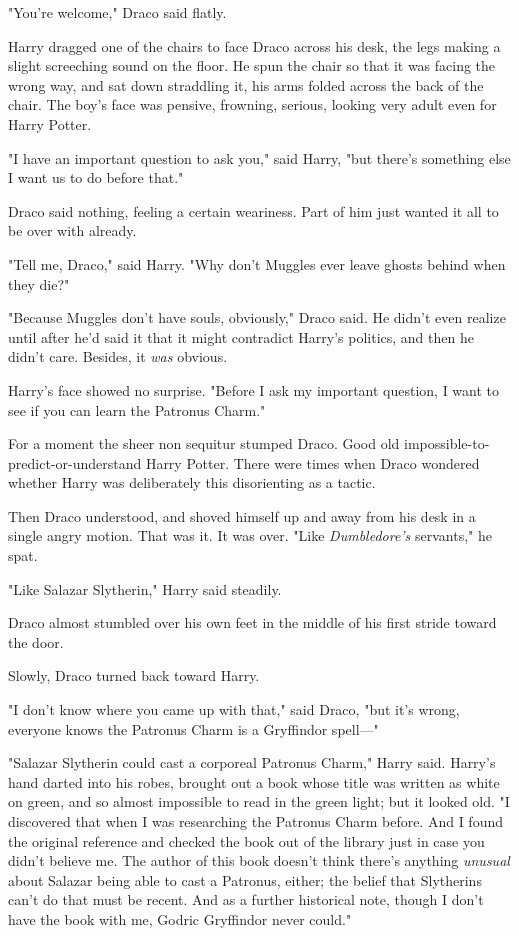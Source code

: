 "You're welcome," Draco said flatly.

Harry dragged one of the chairs to face Draco across his desk, the legs making
a slight screeching sound on the floor. He spun the chair so that it was facing
the wrong way, and sat down straddling it, his arms folded across the back of
the chair. The boy's face was pensive, frowning, serious, looking very adult
even for Harry Potter.

"I have an important question to ask you," said Harry, "but there's something
else I want us to do before that."

Draco said nothing, feeling a certain weariness. Part of him just wanted it all
to be over with already.

"Tell me, Draco," said Harry. "Why don't Muggles ever leave ghosts behind when
they die?"

"Because Muggles don't have souls, obviously," Draco said. He didn't even
realize until after he'd said it that it might contradict Harry's politics, and
then he didn't care. Besides, it \emph{was} obvious.

Harry's face showed no surprise. "Before I ask my important question, I want to
see if you can learn the Patronus Charm."

For a moment the sheer non sequitur stumped Draco. Good old
impossible-to-predict-or-understand Harry Potter. There were times when Draco
wondered whether Harry was deliberately this disorienting as a tactic.

Then Draco understood, and shoved himself up and away from his desk in a single
angry motion. That was it. It was over. "Like \emph{Dumbledore's} servants," he
spat.

"Like Salazar Slytherin," Harry said steadily.

Draco almost stumbled over his own feet in the middle of his first stride
toward the door.

Slowly, Draco turned back toward Harry.

"I don't know where you came up with that," said Draco, "but it's wrong,
everyone knows the Patronus Charm is a Gryffindor spell\mbox{---}"

"Salazar Slytherin could cast a corporeal Patronus Charm," Harry said. Harry's
hand darted into his robes, brought out a book whose title was written as white
on green, and so almost impossible to read in the green light; but it looked
old. "I discovered that when I was researching the Patronus Charm before. And I
found the original reference and checked the book out of the library just in
case you didn't believe me. The author of this book doesn't think there's
anything \emph{unusual} about Salazar being able to cast a Patronus, either;
the belief that Slytherins can't do that must be recent. And as a further
historical note, though I don't have the book with me, Godric Gryffindor never
could."

